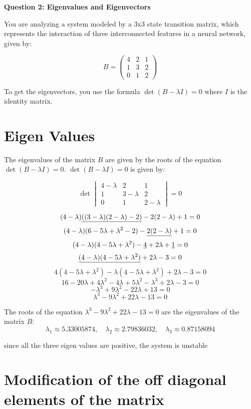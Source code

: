 \documentclass{article}
\begin{document}
\begin{center}
    \large \textbf{Question 2: Eigenvalues and Eigenvectors}
\end{center}
You are analyzing a system modeled by a 3x3 state transition matrix, which represents the interaction
of three interconnected features in a neural network, given by:

\[
B =
\begin{pmatrix}
4 & 2 & 1 \\
1 & 3 & 2 \\
0 & 1 & 2
\end{pmatrix}
\]

To get the eigenvectors, you use the formula \(\det(B - \lambda I) = 0\) where \(I\) is the identity matrix.

\section{Eigen Values}
The eigenvalues of the matrix \(B\) are given by the roots of the equation \(\det(B - \lambda I) = 0\).
\(\det(B - \lambda I) = 0\) is given by:

\[
\det\begin{vmatrix}
4-\lambda & 2 & 1 \\
1 & 3-\lambda & 2 \\
0 & 1 & 2-\lambda
\end{vmatrix} = 0
\]

\[(4-\lambda)\uline{((3-\lambda)(2-\lambda) - 2)} - 2(2-\lambda) + 1  = 0\]
\[(4-\lambda)(6 - 5\lambda + \lambda^2 - 2) - \uline{2(2-\lambda)} + 1 = 0\]
\[(4-\lambda)(4 - 5\lambda + \lambda^2) -\uline{4} + 2\lambda + \uline{1} = 0\]
\[\uline{(4-\lambda)(4 - 5\lambda + \lambda^2)} + 2\lambda - 3 = 0\]
\[4(4 - 5\lambda + \lambda^2) - \lambda(4 - 5\lambda + \lambda^2) + 2\lambda - 3 = 0\]
\[16 - 20\lambda + 4\lambda^2 - 4\lambda + 5\lambda^2 - \lambda^3 + 2\lambda - 3 = 0\]
\[-\lambda^3 + 9\lambda^2 - 22\lambda + 13 = 0\]
\[\lambda^3 - 9\lambda^2 + 22\lambda - 13 = 0\]

The roots of the equation \(\lambda^3 - 9\lambda^2 + 22\lambda - 13 = 0\) are the eigenvalues of the matrix \(B\):
\[\lambda_1 \approx 5.33005874, \quad \lambda_2 \approx 2.79836032, \quad \lambda_3 \approx 0.87158094\]

since all the three eigen values are positive, the system is unstable

\section{Modification of the off diagonal elements of the matrix}
\end{document}
